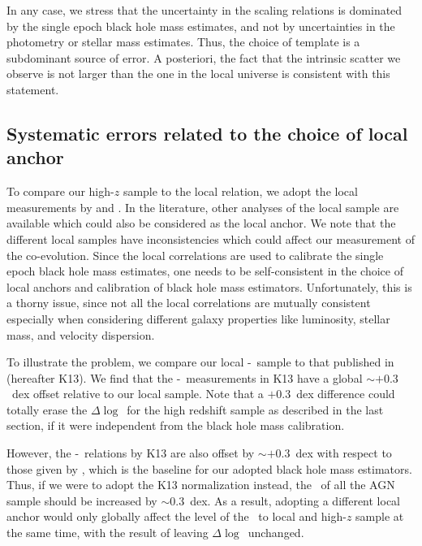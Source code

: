 \documentclass[apj]{emulateapj}
\begin{document}

In any case, we stress that the uncertainty in the scaling relations is dominated by the single epoch black hole mass estimates, and not by uncertainties in the photometry or stellar mass estimates. Thus, the choice of template is a subdominant source of error. A posteriori, the fact that the intrinsic scatter we observe is not larger than the one in the local universe is consistent with this statement.

\subsection{Systematic errors related to the choice of local anchor}
\label{sec:local_sys}

To compare our high-$z$ sample to the local relation, we adopt the local measurements by \citet{Ben++10, Bennert++2011} and  \citet{H+R04}. In the literature, other analyses of the local sample are available which could also be considered as the local anchor. We note that the different local samples have inconsistencies which could affect our measurement of the co-evolution. Since the local correlations are used to calibrate the single epoch black hole mass estimates, one needs to be self-consistent in the choice of local anchors and calibration of black hole mass estimators. Unfortunately, this is a thorny issue, since not all the local correlations are mutually consistent especially when considering different galaxy properties like luminosity, stellar mass, and velocity dispersion.

To illustrate the problem, we compare our local \mbh-\smass\ sample to that published in \citet{Kormendy13} (hereafter K13). We find that the \mbh-\smass\ measurements in K13 have a global $\sim+0.3$~dex offset relative to our local sample. Note that a $+0.3$~dex difference could totally erase the $\Delta\log$\mbh\ for the high redshift sample as described in the last section, if it were independent from the black hole mass calibration.

However, the \mbh-\sigstar\ relations by K13 are also offset by  $\sim+0.3$~dex with respect to those given by \citet{Woo2010}, which is the baseline for our adopted black hole mass estimators. Thus, if we were to adopt the K13 normalization instead, the \mbh\ of all the AGN sample should be increased by $\sim$0.3~dex. As a result, adopting a different local anchor would only globally affect the level of the \mbh\ to local and high-$z$ sample at the same time, with the result of leaving $\Delta\log$\mbh\ unchanged.  
\end{document}
